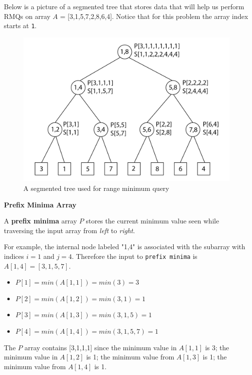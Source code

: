 \documentclass[twoside]{article}
\begin{document}
Below is a picture of a segmented tree that stores data that will help us perform RMQs on array $A$ = [3,1,5,7,2,8,6,4].  Notice that for this problem the array index starts at \texttt{1}.

\begin{figure}[h]
\centering
\includegraphics[width=1\textwidth]{tree.jpg}
\caption{A segmented tree used for range minimum query}
\end{figure}


\newpage

{\large \textbf{Prefix Minima Array}}

A \textbf{prefix minima} array \textbf{$P$} stores the current minimum value seen while traversing the input array from \textit{left} to \textit{right}.

For example, the internal node labeled "1,4" is associated with the subarray with indices $i=1$ and $j=4$. Therefore the input to \texttt{prefix minima} is $A[1,4] = [3,1,5,7]$. 
\begin{itemize}
  \item $P[1] = min(A[1,1]) = min(3) = 3$
  \item $P[2] = min(A[1,2]) = min(3,1) = 1$
  \item $P[3] = min(A[1,3]) = min(3,1,5) = 1$
  \item $P[4] = min(A[1,4]) = min(3,1,5,7) = 1$
\end{itemize}

The $P$ array contains [3,1,1,1] since the minimum value in $A[1,1]$ is 3; the minimum value in $A[1,2]$ is 1; the minimum value from $A[1,3]$ is 1; the minimum value from $A[1,4]$ is 1.

\hspace{5pt}
\end{document}
